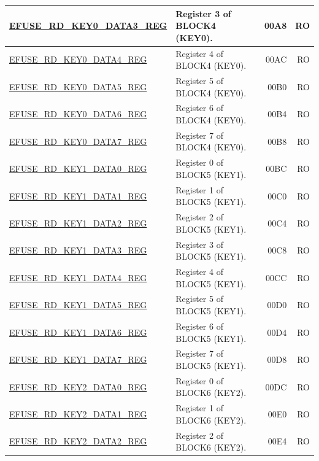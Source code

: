 \begin{longtable}{ | m{6cm} | m{7.2cm} | r| r | }
\hyperref[regdesc:EFUSERDKEY0DATANREG]{EFUSE\_RD\_KEY0\_DATA3\_REG} & Register 3 of BLOCK4 (KEY0). & \hexprefix{}00A8 & RO \\ \hline
\hyperref[regdesc:EFUSERDKEY0DATANREG]{EFUSE\_RD\_KEY0\_DATA4\_REG} & Register 4 of BLOCK4 (KEY0). & \hexprefix{}00AC & RO \\ \hline
\hyperref[regdesc:EFUSERDKEY0DATANREG]{EFUSE\_RD\_KEY0\_DATA5\_REG} & Register 5 of BLOCK4 (KEY0). & \hexprefix{}00B0 & RO \\ \hline
\hyperref[regdesc:EFUSERDKEY0DATANREG]{EFUSE\_RD\_KEY0\_DATA6\_REG} & Register 6 of BLOCK4 (KEY0). & \hexprefix{}00B4 & RO \\ \hline
\hyperref[regdesc:EFUSERDKEY0DATANREG]{EFUSE\_RD\_KEY0\_DATA7\_REG} & Register 7 of BLOCK4 (KEY0). & \hexprefix{}00B8 & RO \\ \hline
\hyperref[regdesc:EFUSERDKEY1DATANREG]{EFUSE\_RD\_KEY1\_DATA0\_REG} & Register 0 of BLOCK5 (KEY1). & \hexprefix{}00BC & RO \\ \hline
\hyperref[regdesc:EFUSERDKEY1DATANREG]{EFUSE\_RD\_KEY1\_DATA1\_REG} & Register 1 of BLOCK5 (KEY1). & \hexprefix{}00C0 & RO \\ \hline
\hyperref[regdesc:EFUSERDKEY1DATANREG]{EFUSE\_RD\_KEY1\_DATA2\_REG} & Register 2 of BLOCK5 (KEY1). & \hexprefix{}00C4 & RO \\ \hline
\hyperref[regdesc:EFUSERDKEY1DATANREG]{EFUSE\_RD\_KEY1\_DATA3\_REG} & Register 3 of BLOCK5 (KEY1). & \hexprefix{}00C8 & RO \\ \hline
\hyperref[regdesc:EFUSERDKEY1DATANREG]{EFUSE\_RD\_KEY1\_DATA4\_REG} & Register 4 of BLOCK5 (KEY1). & \hexprefix{}00CC & RO \\ \hline
\hyperref[regdesc:EFUSERDKEY1DATANREG]{EFUSE\_RD\_KEY1\_DATA5\_REG} & Register 5 of BLOCK5 (KEY1). & \hexprefix{}00D0 & RO \\ \hline
\hyperref[regdesc:EFUSERDKEY1DATANREG]{EFUSE\_RD\_KEY1\_DATA6\_REG} & Register 6 of BLOCK5 (KEY1). & \hexprefix{}00D4 & RO \\ \hline
\hyperref[regdesc:EFUSERDKEY1DATANREG]{EFUSE\_RD\_KEY1\_DATA7\_REG} & Register 7 of BLOCK5 (KEY1). & \hexprefix{}00D8 & RO \\ \hline
\hyperref[regdesc:EFUSERDKEY2DATANREG]{EFUSE\_RD\_KEY2\_DATA0\_REG} & Register 0 of BLOCK6 (KEY2). & \hexprefix{}00DC & RO \\ \hline
\hyperref[regdesc:EFUSERDKEY2DATANREG]{EFUSE\_RD\_KEY2\_DATA1\_REG} & Register 1 of BLOCK6 (KEY2). & \hexprefix{}00E0 & RO \\ \hline
\hyperref[regdesc:EFUSERDKEY2DATANREG]{EFUSE\_RD\_KEY2\_DATA2\_REG} & Register 2 of BLOCK6 (KEY2). & \hexprefix{}00E4 & RO \\ \hline

\end{longtable}
